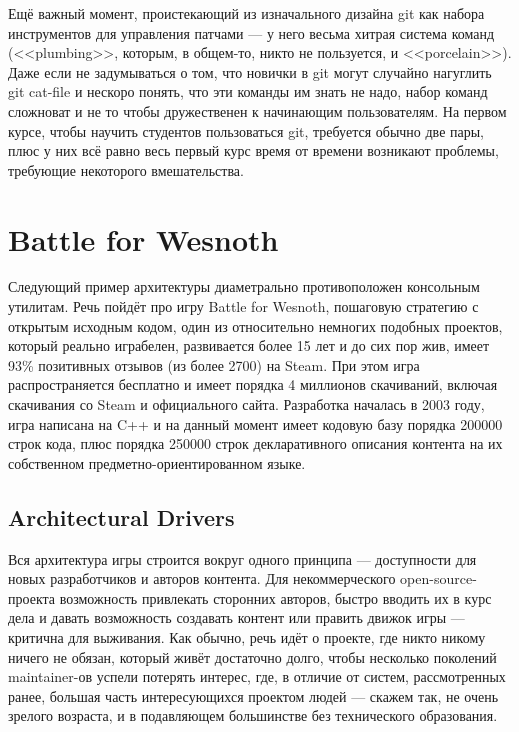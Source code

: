 \documentclass[a5paper]{article}
\begin{document}
Ещё важный момент, проистекающий из изначального дизайна git как набора инструментов для управления патчами --- у него весьма хитрая система команд (<<plumbing>>, которым, в общем-то, никто не пользуется, и <<porcelain>>). Даже если не задумываться о том, что новички в git могут случайно нагуглить git cat-file и нескоро понять, что эти команды им знать не надо, набор команд сложноват и не то чтобы дружественен к начинающим пользователям. На первом курсе, чтобы научить студентов пользоваться git, требуется обычно две пары, плюс у них всё равно весь первый курс время от времени возникают проблемы, требующие некоторого вмешательства.

\section{Battle for Wesnoth}

Следующий пример архитектуры диаметрально противоположен консольным утилитам. Речь пойдёт про игру Battle for Wesnoth, пошаговую стратегию с открытым исходным кодом, один из относительно немногих подобных проектов, который реально играбелен, развивается более 15 лет и до сих пор жив, имеет 93\% позитивных отзывов (из более 2700) на Steam. При этом игра распространяется бесплатно и имеет порядка 4 миллионов скачиваний, включая скачивания со Steam и официального сайта. Разработка началась в 2003 году, игра написана на C++ и на данный момент имеет кодовую базу порядка 200000 строк кода, плюс порядка 250000 строк декларативного описания контента на их собственном предметно-ориентированном языке.

\subsection{Architectural Drivers}

Вся архитектура игры строится вокруг одного принципа --- доступности для новых разработчиков и авторов контента. Для некоммерческого open-source-проекта возможность привлекать сторонних авторов, быстро вводить их в курс дела и давать возможность создавать контент или править движок игры --- критична для выживания. Как обычно, речь идёт о проекте, где никто никому ничего не обязан, который живёт достаточно долго, чтобы несколько поколений maintainer-ов успели потерять интерес, где, в отличие от систем, рассмотренных ранее, большая часть интересующихся проектом людей --- скажем так, не очень зрелого возраста, и в подавляющем большинстве без технического образования.
\end{document}
